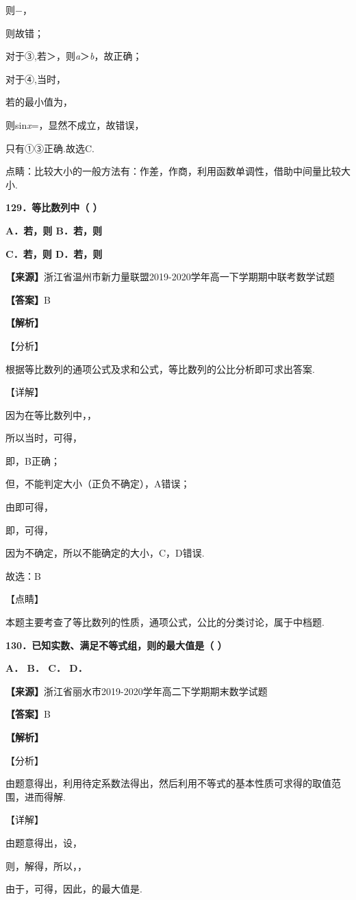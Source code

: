 \documentclass[
]{article}
\begin{document}
则−，

则故错；

对于③,若＞，则\emph{a}＞\emph{b}，故正确；

对于④,当时，

若的最小值为，

则sin\emph{x}=，显然不成立，故错误，

只有①③正确.故选C.

点睛：比较大小的一般方法有：作差，作商，利用函数单调性，借助中间量比较大小.

\textbf{129．等比数列中（ ）}

\textbf{A．若，则 B．若，则}

\textbf{C．若，则 D．若，则}

\textbf{【来源】}浙江省温州市新力量联盟2019-2020学年高一下学期期中联考数学试题

\textbf{【答案】}B

\textbf{【解析】}

【分析】

根据等比数列的通项公式及求和公式，等比数列的公比分析即可求出答案.

【详解】

因为在等比数列中，，

所以当时，可得，

即，B正确；

但，不能判定大小（正负不确定），A错误；

由即可得，

即，可得，

因为不确定，所以不能确定的大小，C，D错误.

故选：B

【点睛】

本题主要考查了等比数列的性质，通项公式，公比的分类讨论，属于中档题.

\textbf{130．已知实数、满足不等式组，则的最大值是（ ）}

\textbf{A． B． C． D．}

\textbf{【来源】}浙江省丽水市2019-2020学年高二下学期期末数学试题

\textbf{【答案】}B

\textbf{【解析】}

【分析】

由题意得出，利用待定系数法得出，然后利用不等式的基本性质可求得的取值范围，进而得解.

【详解】

由题意得出，设，

则，解得，所以，，

由于，可得，因此，的最大值是.
\end{document}
